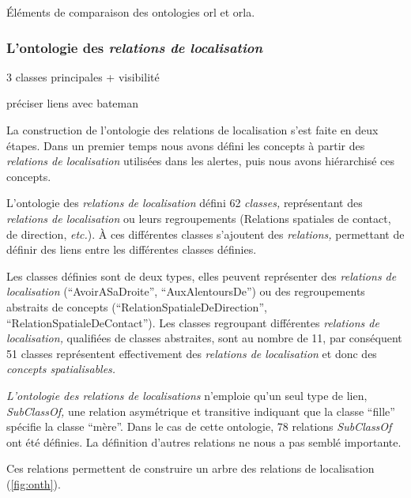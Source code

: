 \begin{table}
  \centering
  
  \caption{Éléments de comparaison des ontologies \ac{orl} et
    \ac{orla}.}
  \label{tab:orl_vs_orla}
\end{table}

\subsubsection{L'ontologie des \emph{relations de localisation}}

3 classes principales + visibilité

préciser liens avec bateman

La construction de l'ontologie des relations de localisation s'est
faite en deux étapes. Dans un premier temps nous avons défini les
concepts à partir des \emph{relations de localisation} utilisées dans
les alertes, puis nous avons hiérarchisé ces concepts.


L'ontologie des \emph{relations de localisation} défini 62
\emph{classes,} représentant des \emph{relations de localisation} ou
leurs regroupements (\eg Relations spatiales de contact, de direction,
\emph{etc.}). À ces différentes classes s'ajoutent des
\emph{relations,} permettant de définir des liens entre les
différentes classes définies.

Les classes définies sont de deux types, elles peuvent représenter des
\emph{relations de localisation} (\eg \enquote{AvoirASaDroite},
\enquote{AuxAlentoursDe}) ou des regroupements abstraits de concepts
(\eg \enquote{RelationSpatialeDeDirection},
\enquote{RelationSpatialeDeContact}). Les classes regroupant
différentes \emph{relations de localisation,} qualifiées de classes
abstraites, sont au nombre de 11, par conséquent 51 classes
représentent effectivement des \emph{relations de localisation} et
donc des \emph{concepts spatialisables.}

\emph{L'ontologie des relations de localisations} n'emploie qu'un seul
type de lien, \emph{SubClassOf,} une relation asymétrique et
transitive indiquant que la classe \enquote{fille} spécifie la classe
\enquote{mère}. Dans le cas de cette ontologie, 78 relations
\emph{SubClassOf} ont été définies. La définition d'autres relations
ne nous a pas semblé importante.

Ces relations permettent de
construire un arbre des relations de localisation
(\autoref{fig:onth}).


